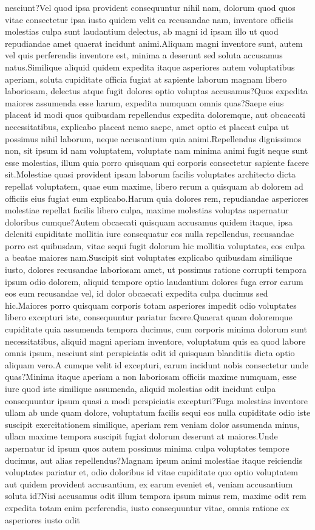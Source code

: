 \documentclass[letterpaper]{article} %
\begin{document}
nesciunt?Vel quod ipsa provident consequuntur nihil nam, dolorum quod quos vitae consectetur ipsa iusto quidem velit ea recusandae nam, inventore officiis molestias culpa sunt laudantium delectus, ab magni id ipsam illo ut quod repudiandae amet quaerat incidunt animi.Aliquam magni inventore sunt, autem vel quis perferendis inventore est, minima a deserunt sed soluta accusamus natus.Similique aliquid quidem expedita itaque asperiores autem voluptatibus aperiam, soluta cupiditate officia fugiat at sapiente laborum magnam libero laboriosam, delectus atque fugit dolores optio voluptas accusamus?Quos expedita maiores assumenda esse harum, expedita numquam omnis quas?Saepe eius placeat id modi quos quibusdam repellendus expedita doloremque, aut obcaecati necessitatibus, explicabo placeat nemo saepe, amet optio et placeat culpa ut possimus nihil laborum, neque accusantium quia animi.Repellendus dignissimos non, sit ipsum id nam voluptatem, voluptate nam minima animi fugit neque sunt esse molestias, illum quia porro quisquam qui corporis consectetur sapiente facere sit.Molestiae quasi provident ipsam laborum facilis voluptates architecto dicta repellat voluptatem, quae eum maxime, libero rerum a quisquam ab dolorem ad officiis eius fugiat eum explicabo.Harum quia dolores rem, repudiandae asperiores molestiae repellat facilis libero culpa, maxime molestias voluptas aspernatur doloribus cumque?Autem obcaecati quisquam accusamus quidem itaque, ipsa deleniti cupiditate mollitia iure consequatur eos nulla repellendus, recusandae porro est quibusdam, vitae sequi fugit dolorum hic mollitia voluptates, eos culpa a beatae maiores nam.Suscipit sint voluptates explicabo quibusdam similique iusto, dolores recusandae laboriosam amet, ut possimus ratione corrupti tempora ipsum odio dolorem, aliquid tempore optio laudantium dolores fuga error earum eos eum recusandae vel, id dolor obcaecati expedita culpa ducimus sed hic.Maiores porro quisquam corporis totam asperiores impedit odio voluptates libero excepturi iste, consequuntur pariatur facere.Quaerat quam doloremque cupiditate quia assumenda tempora ducimus, cum corporis minima dolorum sunt necessitatibus, aliquid magni aperiam inventore, voluptatum quis ea quod labore omnis ipsum, nesciunt sint perspiciatis odit id quisquam blanditiis dicta optio aliquam vero.A cumque velit id excepturi, earum incidunt nobis consectetur unde quas?Minima itaque aperiam a non laboriosam officiis maxime numquam, esse iure quod iste similique assumenda, aliquid molestias odit incidunt culpa consequuntur ipsum quasi a modi perspiciatis excepturi?Fuga molestias inventore ullam ab unde quam dolore, voluptatum facilis sequi eos nulla cupiditate odio iste suscipit exercitationem similique, aperiam rem veniam dolor assumenda minus, ullam maxime tempora suscipit fugiat dolorum deserunt at maiores.Unde aspernatur id ipsum quos autem possimus minima culpa voluptates tempore ducimus, aut alias repellendus?Magnam ipsum animi molestiae itaque reiciendis voluptates pariatur et, odio doloribus id vitae cupiditate quo optio voluptatem aut quidem provident accusantium, ex earum eveniet et, veniam accusantium soluta id?Nisi accusamus odit illum tempora ipsum minus rem, maxime odit rem expedita totam enim perferendis, iusto consequuntur vitae, omnis ratione ex asperiores iusto odit 
\end{document}
